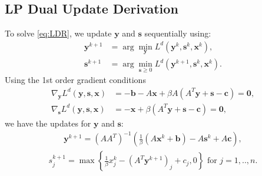 \documentclass{article}
\begin{document}
\subsection*{LP Dual Update Derivation}
To solve \eqref{eq:LDR}, we update $\mathbf{y}$ and $\mathbf{s}$ sequentially using:
\begin{align}
\mathbf{y}^{k+1} & = \arg \min_{\mathbf{y}} L^{d}(\mathbf{y}^{k},\mathbf{s}^k, \mathbf{x}^{k}),\\
\mathbf{s}^{k+1} & = \arg \min_{\mathbf{s} \geq 0} L^{d}(\mathbf{y}^{k+1},\mathbf{s}^k,\mathbf{x}^{k}).
\end{align}
Using the 1st order gradient conditions
\begin{align}
\nabla_{\mathbf{y}}L^{d}(\mathbf{y},\mathbf{s},\mathbf{x}) & =  -\mathbf{b}-A\mathbf{x}+\beta A\left(A^{T}\mathbf{y}+\mathbf{s}-\mathbf{c}\right)  = \mathbf{0}, \label{eq:dual_y_app} \\
\nabla_{\mathbf{s}}L^{d}(\mathbf{y},\mathbf{s},\mathbf{x}) & =  -\mathbf{x}+\beta\left(A^{T}\mathbf{y}+\mathbf{s}-\mathbf{c}\right) =  \mathbf{0},
\end{align}
we have the updates for $\mathbf{y}$ and $\mathbf{s}$:
\begin{align}\label{eq:y_dual_update_app}
\mathbf{y}^{k+1} = \left(AA^{T}\right)^{-1}\left(\frac{1}{\beta}\left(A\mathbf{x}^{k}+\mathbf{b}\right)-A\mathbf{s}^{k}+A\mathbf{c}\right),
\end{align}
\begin{align}\label{eq:s_dual_update_app}
s_j^{k+1} = \max\left\{ \frac{1}{\beta}{x}_j^k-(A^{T}\mathbf{y}^{k+1})_j+{c}_j,0\right\}  \text{ for $j = 1,..,n$}.
\end{align}
\end{document}
